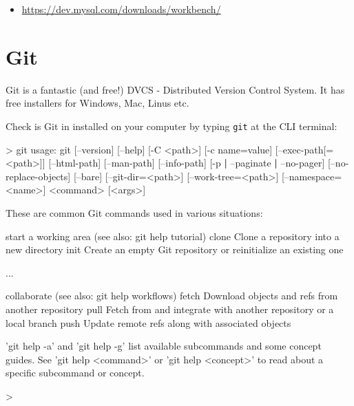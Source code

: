 \documentclass[a4paperpaper,openright]{book}
\newenvironment{Shaded}{}{}
\newcommand{\BuiltInTok}[1]{#1}
\newcommand{\ExtensionTok}[1]{#1}
\newcommand{\FunctionTok}[1]{\textcolor[rgb]{0.02,0.16,0.49}{#1}}
\newcommand{\KeywordTok}[1]{\textcolor[rgb]{0.00,0.44,0.13}{\textbf{#1}}}
\newcommand{\NormalTok}[1]{#1}
\newcommand{\OperatorTok}[1]{\textcolor[rgb]{0.40,0.40,0.40}{#1}}
\newcommand{\StringTok}[1]{\textcolor[rgb]{0.25,0.44,0.63}{#1}}
\providecommand{\tightlist}{%
  \setlength{\itemsep}{0pt}\setlength{\parskip}{0pt}}
\begin{document}
\begin{itemize}
\tightlist
\item
  \url{https://dev.mysql.com/downloads/workbench/}
\end{itemize}

\hypertarget{git}{%
\section{Git}\label{git}}

Git is a fantastic (and free!) DVCS - Distributed Version Control
System. It has free installers for Windows, Mac, Linus etc.

Check is Git in installed on your computer by typing \texttt{git} at the
CLI terminal:

\begin{Shaded}
\begin{Highlighting}[]
    \OperatorTok{>} \FunctionTok{git}
    \ExtensionTok{usage}\NormalTok{: git [--version] [--help] [-C }\OperatorTok{<}\NormalTok{path}\OperatorTok{>}\NormalTok{] [-c name=value]}
\NormalTok{               [}\ExtensionTok{--exec-path}\NormalTok{[=}\OperatorTok{<}\NormalTok{path}\OperatorTok{>}\NormalTok{]] [--html-path] [--man-path] [--info-path]}
\NormalTok{               [}\ExtensionTok{-p} \KeywordTok{|} \ExtensionTok{--paginate} \KeywordTok{|} \ExtensionTok{--no-pager}\NormalTok{] [--no-replace-objects] [--bare]}
\NormalTok{               [}\ExtensionTok{--git-dir}\NormalTok{=}\OperatorTok{<}\NormalTok{path}\OperatorTok{>}\NormalTok{] [--work-tree=}\OperatorTok{<}\NormalTok{path}\OperatorTok{>}\NormalTok{] [--namespace=}\OperatorTok{<}\NormalTok{name}\OperatorTok{>}\NormalTok{]}
               \OperatorTok{<}\BuiltInTok{command}\OperatorTok{>}\NormalTok{ [}\OperatorTok{<}\NormalTok{args}\OperatorTok{>}\NormalTok{]}

    \ExtensionTok{These}\NormalTok{ are common Git commands used in various situations:}

    \ExtensionTok{start}\NormalTok{ a working area (see also: git help tutorial)}
       \ExtensionTok{clone}\NormalTok{      Clone a repository into a new directory}
       \ExtensionTok{init}\NormalTok{       Create an empty Git repository or reinitialize an existing one}

    \ExtensionTok{...}

    \ExtensionTok{collaborate}\NormalTok{ (see also: git help workflows)}
       \ExtensionTok{fetch}\NormalTok{      Download objects and refs from another repository}
       \ExtensionTok{pull}\NormalTok{       Fetch from and integrate with another repository or a local branch}
       \ExtensionTok{push}\NormalTok{       Update remote refs along with associated objects}

    \StringTok{'git help -a'} \ExtensionTok{and} \StringTok{'git help -g'}\NormalTok{ list available subcommands and some}
    \ExtensionTok{concept}\NormalTok{ guides. See }\StringTok{'git help <command>'}\NormalTok{ or }\StringTok{'git help <concept>'}
    \ExtensionTok{to}\NormalTok{ read about a specific subcommand or concept.}

    \OperatorTok{>}
\end{Highlighting}
\end{Shaded}
\end{document}
